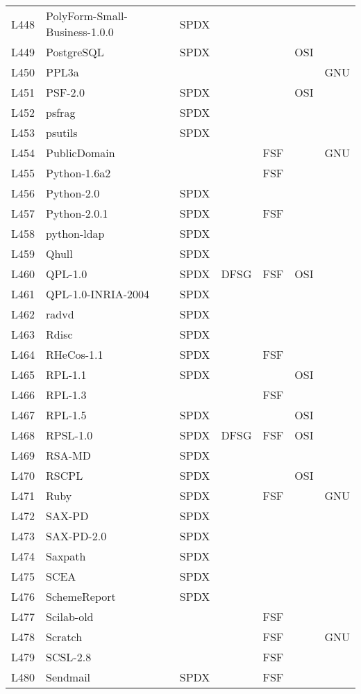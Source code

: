 \begin{longtable}[h]{m{2cm} | m{7cm} | c | c | c | c | c}
L448 & PolyForm-Small-Business-1.0.0 & SPDX &  &  &  &  \\
L449 & PostgreSQL & SPDX &  &  & OSI &  \\
L450 & PPL3a &  &  &  &  & GNU \\
L451 & PSF-2.0 & SPDX &  &  & OSI &  \\
L452 & psfrag & SPDX &  &  &  &  \\
L453 & psutils & SPDX &  &  &  &  \\
L454 & PublicDomain &  &  & FSF &  & GNU \\
L455 & Python-1.6a2 &  &  & FSF &  &  \\
L456 & Python-2.0 & SPDX &  &  &  &  \\
L457 & Python-2.0.1 & SPDX &  & FSF &  &  \\
L458 & python-ldap & SPDX &  &  &  &  \\
L459 & Qhull & SPDX &  &  &  &  \\
L460 & QPL-1.0 & SPDX & DFSG & FSF & OSI &  \\
L461 & QPL-1.0-INRIA-2004 & SPDX &  &  &  &  \\
L462 & radvd & SPDX &  &  &  &  \\
L463 & Rdisc & SPDX &  &  &  &  \\
L464 & RHeCos-1.1 & SPDX &  & FSF &  &  \\
L465 & RPL-1.1 & SPDX &  &  & OSI &  \\
L466 & RPL-1.3 &  &  & FSF &  &  \\
L467 & RPL-1.5 & SPDX &  &  & OSI &  \\
L468 & RPSL-1.0 & SPDX & DFSG & FSF & OSI &  \\
L469 & RSA-MD & SPDX &  &  &  &  \\
L470 & RSCPL & SPDX &  &  & OSI &  \\
L471 & Ruby & SPDX &  & FSF &  & GNU \\
L472 & SAX-PD & SPDX &  &  &  &  \\
L473 & SAX-PD-2.0 & SPDX &  &  &  &  \\
L474 & Saxpath & SPDX &  &  &  &  \\
L475 & SCEA & SPDX &  &  &  &  \\
L476 & SchemeReport & SPDX &  &  &  &  \\
L477 & Scilab-old &  &  & FSF &  &  \\
L478 & Scratch &  &  & FSF &  & GNU \\
L479 & SCSL-2.8 &  &  & FSF &  &  \\
L480 & Sendmail & SPDX &  & FSF &  &  \\

\end{longtable}
